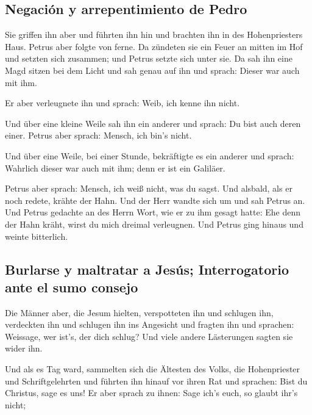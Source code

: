 \hypertarget{negaciuxf3n-y-arrepentimiento-de-pedro}{%
\subsection{Negación y arrepentimiento de
Pedro}\label{negaciuxf3n-y-arrepentimiento-de-pedro}}

 Sie griffen ihn aber und führten ihn hin und brachten
ihn in des Hohenpriesters Haus. Petrus aber folgte von ferne.
 Da zündeten sie ein Feuer an mitten im Hof und setzten
sich zusammen; und Petrus setzte sich unter sie.  Da sah
ihn eine Magd sitzen bei dem Licht und sah genau auf ihn und sprach:
Dieser war auch mit ihm.

 Er aber verleugnete ihn und sprach: Weib, ich kenne ihn
nicht.

 Und über eine kleine Weile sah ihn ein anderer und
sprach: Du bist auch deren einer. Petrus aber sprach: Mensch, ich bin's
nicht.

 Und über eine Weile, bei einer Stunde, bekräftigte es
ein anderer und sprach: Wahrlich dieser war auch mit ihm; denn er ist
ein Galiläer.

 Petrus aber sprach: Mensch, ich weiß nicht, was du
sagst. Und alsbald, als er noch redete, krähte der Hahn. 
Und der Herr wandte sich um und sah Petrus an. Und Petrus gedachte an
des Herrn Wort, wie er zu ihm gesagt hatte: Ehe denn der Hahn kräht,
wirst du mich dreimal verleugnen.  Und Petrus ging hinaus
und weinte bitterlich.

\hypertarget{burlarse-y-maltratar-a-jesuxfas-interrogatorio-ante-el-sumo-consejo}{%
\subsection{Burlarse y maltratar a Jesús; Interrogatorio ante el sumo
consejo}\label{burlarse-y-maltratar-a-jesuxfas-interrogatorio-ante-el-sumo-consejo}}

 Die Männer aber, die Jesum hielten, verspotteten ihn und
schlugen ihn,  verdeckten ihn und schlugen ihn ins
Angesicht und fragten ihn und sprachen: Weissage, wer ist's, der dich
schlug?  Und viele andere Lästerungen sagten sie wider
ihn.

 Und als es Tag ward, sammelten sich die Ältesten des
Volks, die Hohenpriester und Schriftgelehrten und führten ihn hinauf vor
ihren Rat  und sprachen: Bist du Christus, sage es uns!
Er aber sprach zu ihnen: Sage ich's euch, so glaubt ihr's nicht;

